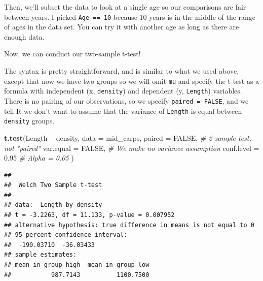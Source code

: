 \documentclass[
]{book}
\newenvironment{Shaded}{\begin{snugshade}}{\end{snugshade}}
\newcommand{\CommentTok}[1]{\textcolor[rgb]{0.56,0.35,0.01}{\textit{#1}}}
\newcommand{\DataTypeTok}[1]{\textcolor[rgb]{0.13,0.29,0.53}{#1}}
\newcommand{\DecValTok}[1]{\textcolor[rgb]{0.00,0.00,0.81}{#1}}
\newcommand{\FloatTok}[1]{\textcolor[rgb]{0.00,0.00,0.81}{#1}}
\newcommand{\KeywordTok}[1]{\textcolor[rgb]{0.13,0.29,0.53}{\textbf{#1}}}
\newcommand{\NormalTok}[1]{#1}
\newcommand{\OperatorTok}[1]{\textcolor[rgb]{0.81,0.36,0.00}{\textbf{#1}}}
\newcommand{\OtherTok}[1]{\textcolor[rgb]{0.56,0.35,0.01}{#1}}
\newcommand{\StringTok}[1]{\textcolor[rgb]{0.31,0.60,0.02}{#1}}
\begin{document}
\begin{Shaded}
\end{Shaded}

Then, we'll subset the data to look at a single age so our comparisons are fair between years. I picked \texttt{Age\ ==\ 10} because 10 years is in the middle of the range of ages in the data set. You can try it with another age as long as there are enough data.

\begin{Shaded}
\end{Shaded}

Now, we can conduct our two-sample t-test!

The syntax is pretty straightforward, and is similar to what we used above, except that now we have two groups so we will omit \texttt{mu} and specify the t-test as a formula with independent (x, \texttt{density}) and dependent (y, \texttt{Length}) variables. There is no pairing of our observations, so we specify \texttt{paired\ =\ FALSE}, and we tell R we don't want to assume that the variance of \texttt{Length} is equal between \texttt{density} groups.

\begin{Shaded}
\begin{Highlighting}[]
  \KeywordTok{t.test}\NormalTok{(Length }\OperatorTok{~}\StringTok{ }\NormalTok{density,}
         \DataTypeTok{data =}\NormalTok{ mid_carps,}
         \DataTypeTok{paired =} \OtherTok{FALSE}\NormalTok{,      }\CommentTok{# 2-sample test, not "paired"}
         \DataTypeTok{var.equal =} \OtherTok{FALSE}\NormalTok{,   }\CommentTok{# We make no variance assumption}
         \DataTypeTok{conf.level =} \FloatTok{0.95}    \CommentTok{# Alpha = 0.05}
\NormalTok{    )}
\end{Highlighting}
\end{Shaded}

\begin{verbatim}
## 
## 	Welch Two Sample t-test
## 
## data:  Length by density
## t = -3.2263, df = 11.133, p-value = 0.007952
## alternative hypothesis: true difference in means is not equal to 0
## 95 percent confidence interval:
##  -190.03710  -36.03433
## sample estimates:
## mean in group high  mean in group low 
##           987.7143          1100.7500
\end{verbatim}
\end{document}
